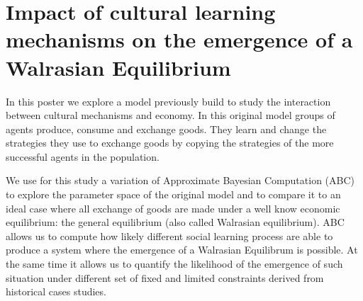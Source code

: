 \documentclass[a4paper,10pt]{report}
\begin{document}
\section*{Impact of cultural learning mechanisms on the emergence of a Walrasian Equilibrium}

In this poster we explore a model previously build to study the interaction between cultural mechanisms and economy. In this original model groups of agents produce, consume and exchange goods. They learn and change the strategies they use to exchange goods by copying the strategies of the more successful agents in the population.

We use for this study a variation of Approximate Bayesian Computation (ABC) to explore the parameter space of the original model and to compare it to an ideal case where all exchange of goods are made under a well  know economic equilibrium: the  general equilibrium (also called Walrasian equilibrium). ABC allows us to compute how likely different social learning process are able to produce a system where the emergence of a Walrasian Equilibrum is possible. At the same time it allows us to quantify the likelihood of the emergence of such situation under different set of fixed and limited constraints derived from historical cases studies.
\end{document}
